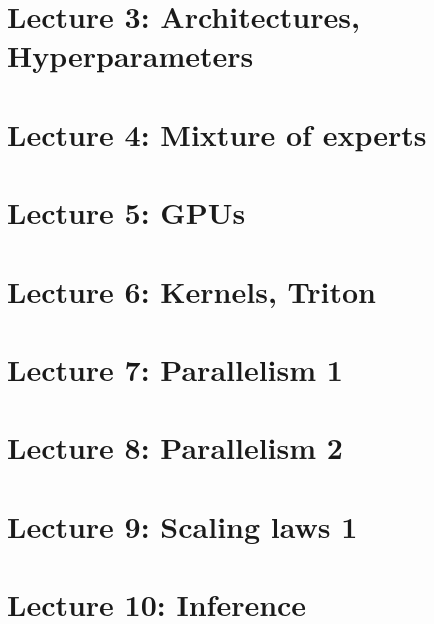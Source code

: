 \documentclass[a4paper]{article}
\begin{document}
\section{Lecture 3: Architectures, Hyperparameters}


\section{Lecture 4: Mixture of experts}


\section{Lecture 5: GPUs}


\section{Lecture 6: Kernels, Triton}


\section{Lecture 7: Parallelism 1}


\section{Lecture 8: Parallelism 2}


\section{Lecture 9: Scaling laws 1}


\section{Lecture 10: Inference}

\end{document}
